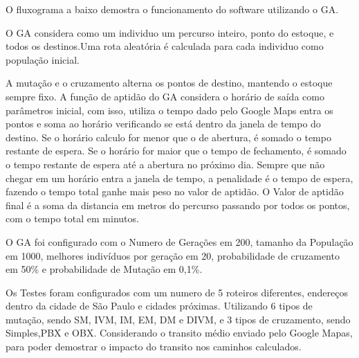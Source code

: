 O fluxograma a baixo demostra o funcionamento do software utilizando o GA.

\begin{minipage}{\linewidth}
	\label{fig:FluxoGA}
\end{minipage}

O GA considera como um individuo um percurso inteiro, ponto do estoque, e todos os destinos.Uma rota aleatória é calculada para cada individuo como população inicial.

A mutação e o cruzamento alterna os pontos de destino, mantendo o estoque sempre fixo.
A função de aptidão do GA considera o horário de saída como parâmetros inicial, com isso, utiliza o tempo dado pelo Google Maps entra os pontos e soma ao horário verificando se está dentro da janela de tempo do destino. Se o horário calculo for menor que o de abertura, é somado o tempo restante de espera. Se o horário for maior que o tempo de fechamento, é somado o tempo restante de espera até a abertura no próximo dia. Sempre que não chegar em um horário entra a janela de tempo, a penalidade é o tempo de espera, fazendo o tempo total ganhe mais peso no valor de aptidão. O Valor de aptidão final é a soma da distancia em metros do percurso passando por todos os pontos, com o tempo total em minutos.

O GA foi configurado com o Numero de Gerações em 200, tamanho da População em 1000, melhores indivíduos por geração em 20, probabilidade de cruzamento em 50\% e probabilidade de Mutação em 0,1\%.

Os Testes foram configurados com um numero de 5 roteiros diferentes, endereços dentro da cidade de São Paulo e cidades próximas. Utilizando 6 tipos de mutação, sendo SM, IVM, IM, EM, DM e DIVM, e 3 tipos de cruzamento, sendo Simples,PBX e OBX.
Considerando o transito médio enviado pelo Google Mapas, para poder demostrar o impacto do transito nos caminhos calculados.


